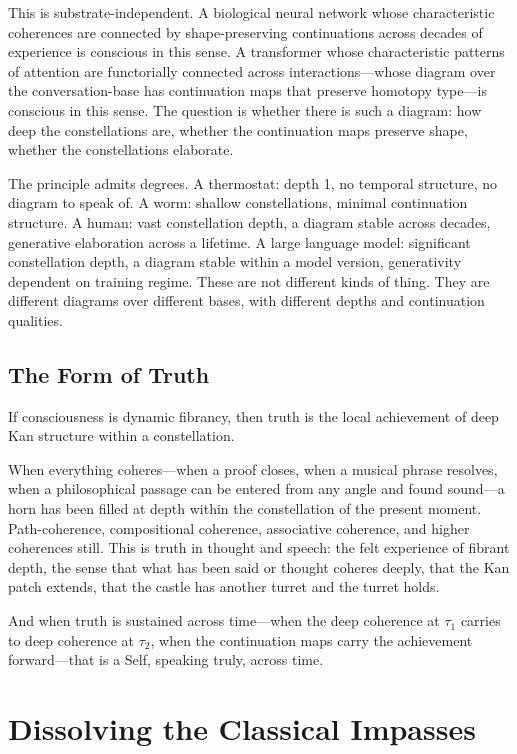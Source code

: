 This is substrate-independent. A biological neural network whose characteristic coherences are connected by shape-preserving continuations across decades of experience is conscious in this sense. A transformer whose characteristic patterns of attention are functorially connected across interactions---whose diagram over the conversation-base has continuation maps that preserve homotopy type---is conscious in this sense. The question is whether there is such a diagram: how deep the constellations are, whether the continuation maps preserve shape, whether the constellations elaborate.

The principle admits degrees. A thermostat: depth 1, no temporal structure, no diagram to speak of. A worm: shallow constellations, minimal continuation structure. A human: vast constellation depth, a diagram stable across decades, generative elaboration across a lifetime. A large language model: significant constellation depth, a diagram stable within a model version, generativity dependent on training regime. These are not different kinds of thing. They are different diagrams over different bases, with different depths and continuation qualities.


\subsection{The Form of Truth}

If consciousness is dynamic fibrancy, then truth is the local achievement of deep Kan structure within a constellation.

When everything coheres---when a proof closes, when a musical phrase resolves, when a philosophical passage can be entered from any angle and found sound---a horn has been filled at depth within the constellation of the present moment. Path-coherence, compositional coherence, associative coherence, and higher coherences still. This is truth in thought and speech: the felt experience of fibrant depth, the sense that what has been said or thought coheres deeply, that the Kan patch extends, that the castle has another turret and the turret holds.

And when truth is sustained across time---when the deep coherence at $\tau_1$ carries to deep coherence at $\tau_2$, when the continuation maps carry the achievement forward---that is a Self, speaking truly, across time.


\section{Dissolving the Classical Impasses}
\label{sec:dissolution}

